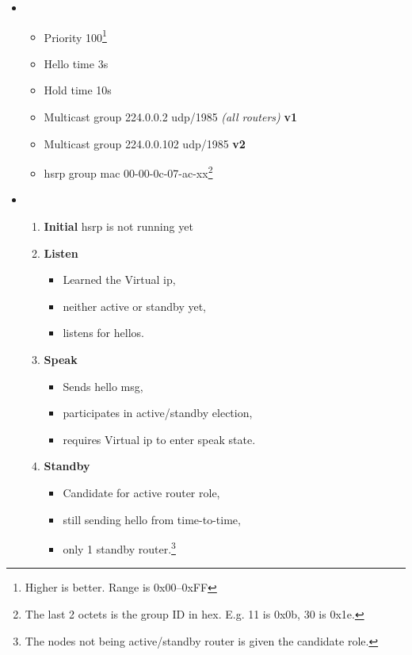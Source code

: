 \begin{itemize}
    \item {}
    \begin{itemize}
        \item Priority 100\footnote{Higher is better. Range is 0x00--0xFF}
        \item Hello time 3s
        \item Hold time 10s
        \item Multicast group 224.0.0.2 udp/1985 \textit{(all routers)} {\scriptsize \textbf{v1}}
        \item Multicast group 224.0.0.102 udp/1985 {\scriptsize \textbf{v2}}
        \item \gls{hsrp} group mac 00-00-0c-07-ac-xx\footnote{The last 2 octets is the group ID in hex. E.g. 11 is 0x0b, 30 is 0x1e.}
    \end{itemize}
    \item {}
    \begin{enumerate}
        \item \textbf{Initial} \gls{hsrp} is not running yet
        \item \textbf{Listen}
        \begin{itemize}
            \item Learned the Virtual \gls{ip},
            \item neither active or standby yet,
            \item listens for hellos.
        \end{itemize}
        \item \textbf{Speak}
        \begin{itemize}
            \item Sends hello msg,
            \item participates in active/standby election,
            \item requires Virtual \gls{ip} to enter speak state.
        \end{itemize}
        \item \textbf{Standby}
        \begin{itemize}
            \item Candidate for active router role,
            \item still sending hello from time-to-time,
            \item only 1 standby router.\footnote{The nodes not being active/standby router is given the candidate role.}
        \end{itemize}

\end{enumerate}
\end{itemize}
